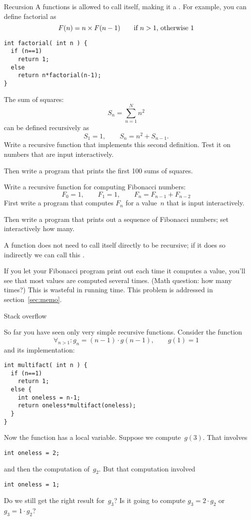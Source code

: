 \begin{slide}{Recursion}
  \label{sl:func-recur}
  A functions is allowed to call itself, making it a .
  For example, you can define factorial as
  \[ F(n) = n \times F(n-1) \qquad \hbox{if $n>1$, otherwise~$1$} \]
\begin{lstlisting}
int factorial( int n ) {
  if (n==1)
    return 1;
  else
    return n*factorial(n-1);
}
\end{lstlisting}
\end{slide}

\begin{exercise}
  \label{ex:recur-sum}
  The sum of squares:
  \[ S_n = \sum_{n=1}^N n^2 \]
  can be defined recursively as
  \[ S_1=1,\qquad S_n = n^2 + S_{n-1}. \]
  Write a recursive function that implements this second definition.
  Test it on numbers that are input interactively.

  Then write a program that prints the first 100 sums of squares.
\end{exercise}

\begin{exercise}
  \label{ex:recur-fib}
  Write a recursive function for computing Fibonacci numbers:
  \[ F_0=1,\qquad F_1=1,\qquad F_{n}=F_{n-1}+F_{n-2} \]
  First write a program that computes $F_n$ for a value~$n$ that is
  input interactively.

  Then write a program that prints out a sequence of Fibonacci
  numbers; set interactively how many.
\end{exercise}

\begin{remark}
  A function does not need to call itself directly to be recursive; if
  it does so indirectly we can call this .
\end{remark}

\begin{remark}
  If you let your Fibonacci program print out each time it computes a
  value, you'll see that most values are computed several times. (Math
  question: how many times?) This is wasteful in running time. This
  problem is addressed in section~\ref{sec:memo}.
\end{remark}

 {Stack overflow}

So far you have seen only very simple recursive functions. Consider
the function
\[ \forall_{n>1}\colon g_n = (n-1)\cdot g(n-1),\qquad g(1)=1 \]
and its implementation:
\begin{lstlisting}
int multifact( int n ) {
  if (n==1)
    return 1;
  else {
    int oneless = n-1;
    return oneless*multifact(oneless);
  }
}
\end{lstlisting}
Now the function has a local variable. Suppose we compute~$g(3)$. That
involves
\begin{lstlisting}
int oneless = 2;
\end{lstlisting}
and then the computation of~$g_2$. But that computation involved 
\begin{lstlisting}
int oneless = 1;
\end{lstlisting}
Do we still get the right result for~$g_3$? Is it going to compute
$g_3=2\cdot g_2$ or $g_3=1\cdot g_2$?

